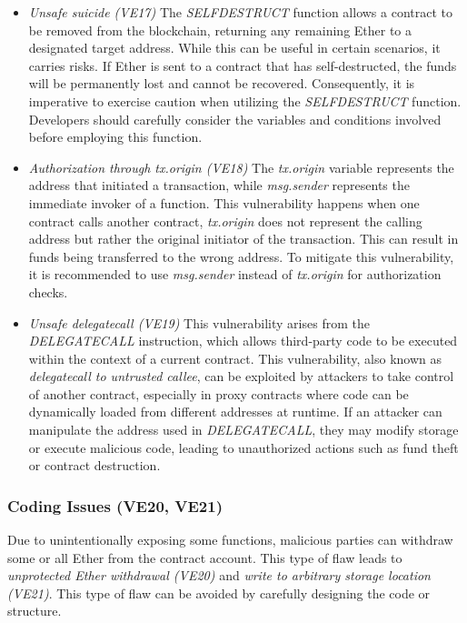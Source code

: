 \documentclass[manuscript,screen]{acmart}
\begin{document}
\begin{itemize}
  \item \textit{Unsafe suicide (VE17)} The \textit{SELFDESTRUCT} function allows a contract to be removed from the blockchain, returning any remaining Ether to a designated target address. While this can be useful in certain scenarios, it carries risks. If Ether is sent to a contract that has self-destructed, the funds will be permanently lost and cannot be recovered. Consequently, it is imperative to exercise caution when utilizing the \textit{SELFDESTRUCT} function. Developers should carefully consider the variables and conditions involved before employing this function. 
  
  \item \textit{Authorization through tx.origin (VE18)} The \textit{tx.origin} variable represents the address that initiated a transaction, while \textit{msg.sender} represents the immediate invoker of a function. This vulnerability happens when one contract calls another contract, \textit{tx.origin} does not represent the calling address but rather the original initiator of the transaction. This can result in funds being transferred to the wrong address. To mitigate this vulnerability, it is recommended to use \textit{msg.sender} instead of \textit{tx.origin} for authorization checks.
  
  \item \textit{Unsafe delegatecall (VE19)} This vulnerability arises from the \textit{DELEGATECALL} instruction, which allows third-party code to be executed within the context of a current contract. This vulnerability, also known as \textit{delegatecall to untrusted callee}, can be exploited by attackers to take control of another contract, especially in proxy contracts where code can be dynamically loaded from different addresses at runtime. If an attacker can manipulate the address used in \textit{DELEGATECALL}, they may modify storage or execute malicious code, leading to unauthorized actions such as fund theft or contract destruction.
\end{itemize}

\subsubsection{Coding Issues (VE20, VE21)}
Due to unintentionally exposing some functions, malicious parties can withdraw some or all Ether from the contract account. This type of flaw leads to \textit{unprotected Ether withdrawal (VE20)} and \textit{write to arbitrary storage location (VE21)}. This type of flaw can be avoided by carefully designing the code or structure.
\end{document}
